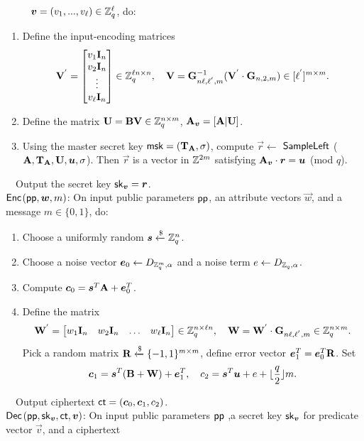 ~~~~~$\boldsymbol{v}=(v_{1},...,v_{\ell}) \in \mathbb{Z}^{\ell}_{q}$, do:
\begin{enumerate}
\item Define the input-encoding matrices
\begin{equation}
\mathbf{V}^{'}= \begin{bmatrix}
v_{1} \textbf{I}_{n}\\
v_{2} \textbf{I}_{n}\\
\vdots\\
v_{\ell} \textbf{I}_{n}
\end{bmatrix} \in \mathbb{Z}^{\ell n \times n}_{q},~~~ \mathbf{V}=\mathbf{G}^{-1}_{n\ell,\ell^{'},m}(\mathbf{V}^{'}\cdot \mathbf{G}_{n,2,m}) \in [\ell^{'}]^{m \times m}.
\end{equation}

\item Define the  matrix $\mathbf{U}=\mathbf{BV} \in \mathbb{Z}^{n \times m}_{q}$, $\mathbf{A}_{\boldsymbol{v}}=[\mathbf{A}|\mathbf{U}]$.\\

\item Using the master secret key $\mathsf{msk}=(\mathbf{T}_{\mathbf{A}},\sigma)$, compute $\vec{r}\leftarrow$ $\mathsf{SampleLeft}$ ($\textbf{A}, \mathbf{T}_{\mathbf{A}},\mathbf{U}, \boldsymbol{u},\sigma$). Then $\vec{r}$ is a vector in $\mathbb{Z}^{2m}$ satisfying $\mathbf{A}_{\boldsymbol{v}}\cdot \boldsymbol{r}=\boldsymbol{u}$ (mod $q$).
\end{enumerate}
~~Output the secret key  $\mathsf{sk}_{\boldsymbol{v}}=\boldsymbol{r}$.\\[0.4cm]
$\mathsf{Enc}$$(\mathsf{pp},\boldsymbol{w},m)$: On input public parameters $\mathsf{pp}$, an attribute vectors $\vec{w}$, and a message $m \in \{0,1\}$, do:
\begin{enumerate}
\item Choose a uniformly random $\boldsymbol{s}\xleftarrow{\$} \mathbb{Z}^{n}_{q}$.\\
\item Choose a noise vector $\boldsymbol{e}_{0}\leftarrow D_{\mathbb{Z}^{m}_{q},\alpha}$ and a noise term $e\leftarrow D_{\mathbb{Z}_{q},\alpha}$.\\
\item Compute $\boldsymbol{c}_{0}=\boldsymbol{s}^{T}\mathbf{A}+\boldsymbol{e}^{T}_{0}$.\\
\item Define the matrix
\begin{equation}
\mathbf{W}^{'}= \begin{bmatrix}
w_{1} \mathbf{I}_{n}&w_{2} \mathbf{I}_{n}&\ldots&w_{\ell} \mathbf{I}_{n}
\end{bmatrix} \in \mathbb{Z}^{n \times \ell n}_{q},~~~ \mathbf{W}=\mathbf{W}^{'}\cdot \mathbf{G}_{n\ell,\ell^{'},m} \in \mathbb{Z}^{n \times m}_{q}.
\end{equation}
Pick a random matrix $\mathbf{R}\xleftarrow{\$} \{-1,1\}^{m \times m}$, define error vector $\boldsymbol{e}^{T}_{1}=\boldsymbol{e}^{T}_{0}\mathbf{R}$. Set
\begin{equation}
\boldsymbol{c}_{1}=\boldsymbol{s}^{T}(\mathbf{B}+\mathbf{W})+\boldsymbol{e}^{T}_{1},~~~c_{2}=\boldsymbol{s}^{T}\boldsymbol{u}+e+\lfloor \frac{q}{2} \rfloor m.
\end{equation}
\end{enumerate}
~~Output ciphertext  $\mathsf{ct}=(\boldsymbol{c}_{0},\boldsymbol{c}_{1},c_{2})$.\\[0.4cm]
$\mathsf{Dec}$$(\mathsf{pp},\mathsf{sk}_{\boldsymbol{v}},\mathsf{ct},\boldsymbol{v})$: On input public parameters $\mathsf{pp}$ ,a secret key $\mathsf{sk}_{\boldsymbol{v}}$ for predicate vector $\vec{v}$, and a ciphertext

